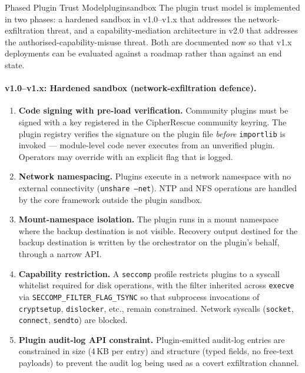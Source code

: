 \documentclass[11pt,a4paper]{report}
\begin{document}
\begin{solution}{Phased Plugin Trust Model}{pluginsandbox}
\label{sec:plugintrust}
The plugin trust model is implemented in two phases: a hardened sandbox in v1.0--v1.x that addresses the network-exfiltration threat, and a capability-mediation architecture in v2.0 that addresses the authorised-capability-misuse threat. Both are documented now so that v1.x deployments can be evaluated against a roadmap rather than against an end state.

\paragraph{v1.0--v1.x: Hardened sandbox (network-exfiltration defence).}
\begin{enumerate}[noitemsep]
  \item \textbf{Code signing with pre-load verification.} Community plugins must be signed with a key registered in the CipherRescue community keyring. The plugin registry verifies the signature on the plugin file \emph{before} \texttt{importlib} is invoked --- module-level code never executes from an unverified plugin. Operators may override with an explicit flag that is logged.
  \item \textbf{Network namespacing.} Plugins execute in a network namespace with no external connectivity (\texttt{unshare --net}). NTP and NFS operations are handled by the core framework outside the plugin sandbox.
  \item \textbf{Mount-namespace isolation.} The plugin runs in a mount namespace where the backup destination is not visible. Recovery output destined for the backup destination is written by the orchestrator on the plugin's behalf, through a narrow API.
  \item \textbf{Capability restriction.} A \texttt{seccomp} profile restricts plugins to a syscall whitelist required for disk operations, with the filter inherited across \texttt{execve} via \texttt{SECCOMP\_FILTER\_FLAG\_TSYNC} so that subprocess invocations of \texttt{cryptsetup}, \texttt{dislocker}, etc., remain constrained. Network syscalls (\texttt{socket}, \texttt{connect}, \texttt{sendto}) are blocked.
  \item \textbf{Plugin audit-log API constraint.} Plugin-emitted audit-log entries are constrained in size (4\,KB per entry) and structure (typed fields, no free-text payloads) to prevent the audit log being used as a covert exfiltration channel.
\end{enumerate}


\end{solution}
\end{document}
